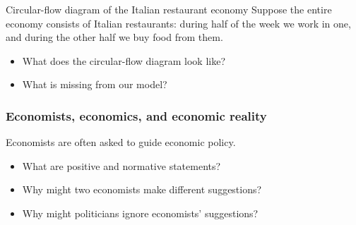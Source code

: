 \documentclass{beamer}
\begin{document}
\begin{frame}{Circular-flow diagram of the Italian restaurant economy}
    Suppose the entire economy consists of Italian restaurants: during half of the week we work in one, and during the other half we buy food from them.

    \medskip

    \begin{itemize}
        \item What does the circular-flow diagram look like?
        \item What is missing from our model?
    \end{itemize}

\end{frame}

\begin{frame}
    \frametitle{Economists, economics, and economic reality}    
    Economists are often asked to guide economic policy.
    \begin{itemize}
        \item What are positive and normative statements?
        \item Why might two economists make different suggestions?
        \item Why might politicians ignore economists' suggestions?
    \end{itemize}
\end{frame}
\end{document}
